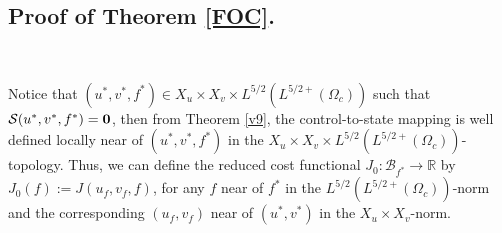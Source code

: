 \documentclass[11pt,reqno]{amsart}%
\newtheorem{remark}{Remark}[section]
\numberwithin{equation}{section}
\begin{document}
{%
%
%

\subsection{%
Proof of Theorem \ref{FOC}.} \label{Sec:FOC}

\

Notice that $(u^*,v^*,f^*)\in X_u\times X_v\times L^{5/2}(L^{5/2+}(\Omega_c))$ such that $\mathcal{S}(u^*,v^*,f^*)=\bf 0$, then 
 from Theorem \ref{v9}, the control-to-state mapping is well defined locally near of $(u^*,v^*,f^*)$ in the $X_u\times X_v\times L^{5/2}(L^{5/2+}(\Omega_c))$-topology. Thus, we can define the reduced cost functional $J_0:\mathcal{B}_{f^*}\rightarrow \mathbb{R}$ by $J_0(f):=J(u_f,v_f,f)$, for any $f$ near of $f^*$ in the $L^{5/2}(L^{5/2+}(\Omega_c))$-norm and the corresponding $(u_f,v_f)$ near of $(u^*,v^*)$ in the $X_u\times X_v$-norm. 
 
}
\end{document}
